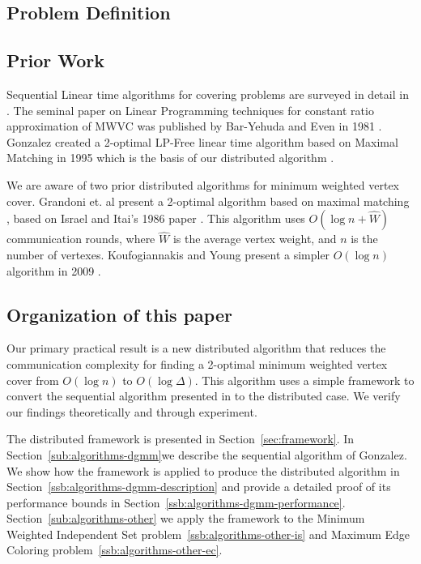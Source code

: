 \documentclass[conference, 10pt, letter]{IEEEtran}
\begin{document}
\subsection{Problem Definition}

\subsection{Prior Work}

Sequential Linear time algorithms for covering problems are surveyed in detail in \cite{254190}. The seminal paper on Linear Programming techniques for constant ratio approximation of MWVC was published by Bar-Yehuda and Even in 1981 \cite{Bar-Yehuda:1981lr}. Gonzalez created a 2-optimal LP-Free linear time algorithm based on Maximal Matching in 1995 which is the basis of our distributed algorithm \cite{Gonzalez1995129}. 

We are aware of two prior distributed algorithms for minimum weighted vertex cover. Grandoni et. al present a 2-optimal algorithm based on maximal matching \cite{1435381}, based on Israel and Itai's 1986 paper \cite{Israel:1986:FSR:5361.5365}. This algorithm uses $O(\log n + \hat{W})$ communication rounds, where $\hat{W}$ is the average vertex weight, and $n$ is the number of vertexes. Koufogiannakis and Young present a simpler $O(\log n)$ algorithm in 2009 \cite{1582746}.

\subsection{Organization of this paper}
Our primary practical result is a new distributed algorithm that reduces the communication complexity for finding a 2-optimal minimum weighted vertex cover from $O(\log n)$ to $O(\log \Delta)$. This algorithm uses a simple framework to convert the sequential algorithm presented in \cite{Gonzalez1995129} to the distributed case. We verify our findings theoretically and through experiment.

The distributed framework is presented in Section~\ref{sec:framework}. In Section~\ref{sub:algorithms-dgmm}we describe the sequential algorithm of Gonzalez. We show how the framework is applied to produce the distributed algorithm in Section~\ref{ssb:algorithms-dgmm-description} and provide a detailed proof of its performance bounds in Section~\ref{ssb:algorithms-dgmm-performance}. Section~\ref{sub:algorithms-other} we apply the framework to the Minimum Weighted Independent Set problem~\ref{ssb:algorithms-other-is} and Maximum Edge Coloring problem~\ref{ssb:algorithms-other-ec}.
 
\end{document}
